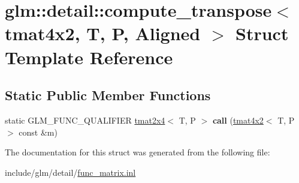 \hypertarget{structglm_1_1detail_1_1compute__transpose_3_01tmat4x2_00_01T_00_01P_00_01Aligned_01_4}{}\section{glm\+:\+:detail\+:\+:compute\+\_\+transpose$<$ tmat4x2, T, P, Aligned $>$ Struct Template Reference}
\label{structglm_1_1detail_1_1compute__transpose_3_01tmat4x2_00_01T_00_01P_00_01Aligned_01_4}
\subsection*{Static Public Member Functions}
\begin{DoxyCompactItemize}
\item 
\mbox{\label{structglm_1_1detail_1_1compute__transpose_3_01tmat4x2_00_01T_00_01P_00_01Aligned_01_4_a12641dcca503b13c30be88f020019308}} 
static G\+L\+M\+\_\+\+F\+U\+N\+C\+\_\+\+Q\+U\+A\+L\+I\+F\+I\+ER \hyperlink{structglm_1_1tmat2x4}{tmat2x4}$<$ T, P $>$ {\bfseries call} (\hyperlink{structglm_1_1tmat4x2}{tmat4x2}$<$ T, P $>$ const \&m)
\end{DoxyCompactItemize}


The documentation for this struct was generated from the following file\+:\begin{DoxyCompactItemize}
\item 
include/glm/detail/\hyperlink{func__matrix_8inl}{func\+\_\+matrix.\+inl}\end{DoxyCompactItemize}
